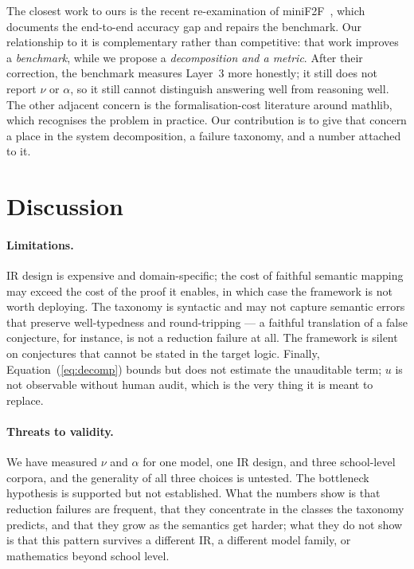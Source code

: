 \documentclass[11pt,a4paper]{article}
\begin{document}
The closest work to ours is the recent re-examination of
miniF2F~\cite{ospanov2025minif2f}, which documents the end-to-end accuracy gap
and repairs the benchmark.  Our relationship to it is complementary rather than
competitive: that work improves a \emph{benchmark}, while we propose a
\emph{decomposition and a metric}.  After their correction, the benchmark
measures Layer~3 more honestly; it still does not report $\nu$ or $\alpha$, so it
still cannot distinguish answering well from reasoning well.  The other adjacent
concern is the formalisation-cost literature around mathlib, which recognises
the problem in practice.  Our contribution is to give that concern a place in
the system decomposition, a failure taxonomy, and a number attached to it.

\section{Discussion}

\paragraph{Limitations.}
IR design is expensive and domain-specific; the cost of faithful semantic
mapping may exceed the cost of the proof it enables, in which case the framework
is not worth deploying.  The taxonomy is syntactic and may not capture semantic
errors that preserve well-typedness and round-tripping --- a faithful
translation of a false conjecture, for instance, is not a reduction failure at
all.  The framework is silent on conjectures that cannot be stated in the target
logic.  Finally, Equation~(\ref{eq:decomp}) bounds but does not estimate the
unauditable term; $u$ is not observable without human audit, which is the very
thing it is meant to replace.

\paragraph{Threats to validity.}
We have measured $\nu$ and $\alpha$ for one model, one IR design, and three
school-level corpora, and the generality of all three choices is untested.  The
bottleneck hypothesis is supported but not established.  What the numbers show
is that reduction failures are frequent, that they concentrate in the classes the
taxonomy predicts, and that they grow as the semantics get harder; what they do
not show is that this pattern survives a different IR, a different model family,
or mathematics beyond school level.
\end{document}
